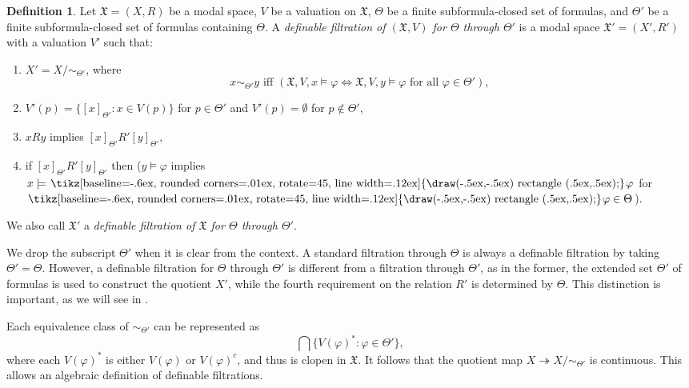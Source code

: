 \documentclass[a4paper,11pt]{article}
\theoremstyle{definition}
\newtheorem{definition}[theorem]{Definition}
\theoremstyle{remark}
\numberwithin{theorem}{section}
\renewcommand{\sp}[1]{\mathfrak{#1}}
\newcommand{\X}{\sp{X}}
\renewcommand{\phi}{\varphi}
\newcommand{\emp}{\emptyset}
\newcommand{\gooddiamond}{\hspace{.2ex}\text{%
  \tikz[baseline=-.6ex, rounded corners=.01ex, rotate=45, line width=.12ex]
    {\draw(-.5ex,-.5ex) rectangle (.5ex,.5ex);}}\kern.2ex}
\renewcommand{\Diamond}{\gooddiamond}
\newcommand{\Dia}{\Diamond}
\newcommand{\surj}{\twoheadrightarrow}
\begin{document}
\begin{definition} \label{3: Def sp filtration}
    Let $\X = (X, R)$ be a modal space, $V$ be a valuation on $\X$, $\Theta$ be a finite subformula-closed set of formulas, and $\Theta'$ be a finite subformula-closed set of formulas containing $\Theta$. A \emph{definable filtration of $(\X, V)$ for $\Theta$ through $\Theta'$} is a modal space $\X' = (X', R')$ with a valuation $V'$ such that:
    \begin{enumerate}
        \item $X' = X/{\sim_{\Theta'}}$, where 
        \[x \sim_{\Theta'} y \text{ iff } (\X, V, x \models \phi \iff \X, V, y \models \phi \text{ for all $\phi \in \Theta'$}),\]
        \item $V'(p) = \{[x]_{\Theta'}: x \in V(p)\}$ for $p \in \Theta'$ and $V'(p) = \emp$ for $p \notin \Theta'$,
        \item $xRy$ implies $[x]_{\Theta'} R' [y]_{\Theta'}$,
        \item if $[x]_{\Theta'} R' [y]_{\Theta'}$ then ($y \models \phi$ implies $x \models \Dia \phi$ for $\Dia \phi \in \Theta$).
    \end{enumerate}
    We also call $\X'$ a \emph{definable filtration of $\X$ for $\Theta$ through $\Theta'$}.
\end{definition}

We drop the subscript $\Theta'$ when it is clear from the context. A standard filtration through $\Theta$ is always a definable filtration by taking $\Theta' = \Theta$. However, a definable filtration for $\Theta$ through $\Theta'$ is different from a filtration through $\Theta'$, as in the former, the extended set $\Theta'$ of formulas is used to construct the quotient $X'$, while the fourth requirement on the relation $R'$ is determined by $\Theta$. This distinction is important, as we will see in .

Each equivalence class of $\sim_{\Theta'}$ can be represented as 
\[\bigcap \{V(\phi)^*: \phi \in \Theta'\},\]
where each $V(\phi)^*$ is either $V(\phi)$ or $V(\phi)^c$, and thus is clopen in $\X$. It follows that the quotient map $X \surj X/\sim_{\Theta'}$ is continuous. This allows an algebraic definition of definable filtrations.
\end{document}
